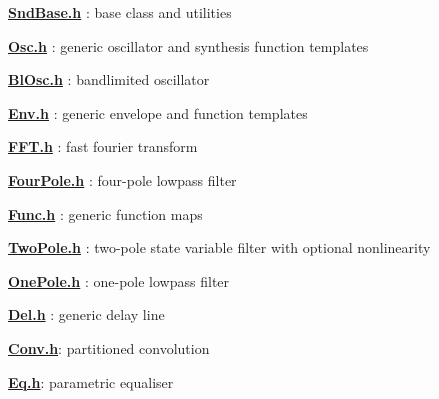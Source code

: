 {\bfseries \hyperlink{_snd_base_8h}{Snd\+Base.\+h}} \+: base class and utilities

{\bfseries \hyperlink{_osc_8h}{Osc.\+h}} \+: generic oscillator and synthesis function templates

{\bfseries \hyperlink{_bl_osc_8h}{Bl\+Osc.\+h}} \+: bandlimited oscillator

{\bfseries \hyperlink{_env_8h}{Env.\+h}} \+: generic envelope and function templates

{\bfseries \hyperlink{_f_f_t_8h}{F\+F\+T.\+h}} \+: fast fourier transform

{\bfseries \hyperlink{_four_pole_8h}{Four\+Pole.\+h}} \+: four-\/pole lowpass filter

{\bfseries \hyperlink{_func_8h}{Func.\+h}} \+: generic function maps

{\bfseries \hyperlink{_two_pole_8h}{Two\+Pole.\+h}} \+: two-\/pole state variable filter with optional nonlinearity

{\bfseries \hyperlink{_one_pole_8h}{One\+Pole.\+h}} \+: one-\/pole lowpass filter

{\bfseries \hyperlink{_del_8h}{Del.\+h}} \+: generic delay line

{\bfseries \hyperlink{_conv_8h}{Conv.\+h}}\+: partitioned convolution

{\bfseries \hyperlink{_eq_8h}{Eq.\+h}}\+: parametric equaliser 
